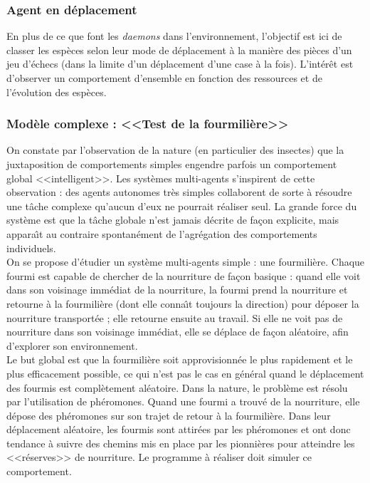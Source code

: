 \documentclass[11pt,twoside,a4paper]{article}
\begin{document}
\subsubsection{Agent en d{\'e}placement}

En plus de ce que font les \emph{daemons} dans l'environnement, l'objectif est ici de classer les esp{\`e}ces selon leur mode de d{\'e}placement {\`a} la mani{\`e}re des pi{\`e}ces d'un jeu d'{\'e}checs (dans la limite d'un d{\'e}placement d'une case {\`a} la fois). L'int{\'e}r{\^e}t est d'observer un comportement d'ensemble en fonction des ressources et de l'{\'e}volution des esp{\`e}ces. 

\clearpage

\subsubsection{Mod{\`e}le complexe : <<Test de la fourmili{\`e}re>>}

On constate par l'observation de la nature (en particulier des insectes) que la juxtaposition de comportements simples engendre parfois un comportement global <<intelligent>>. Les syst{\`e}mes multi-agents s'inspirent de cette observation : des agents autonomes tr{\`e}s simples collaborent de sorte {\`a} r{\'e}soudre une t{\^a}che complexe qu'aucun d'eux ne pourrait r{\'e}aliser seul. La grande force du syst{\`e}me est que la t{\^a}che globale n'est jamais d{\'e}crite de fa\c{c}on explicite, mais appara{\^\i}t au contraire spontan{\'e}ment de l'agr{\'e}gation des comportements individuels.~\\

On se propose d'{\'e}tudier un syst{\`e}me multi-agents simple : une fourmili{\`e}re. Chaque fourmi est capable de chercher de la nourriture de fa\c{c}on basique : quand elle voit dans son voisinage imm{\'e}diat de la nourriture, la fourmi prend la nourriture et retourne {\`a} la fourmili{\`e}re (dont elle conna{\^\i}t toujours la direction) pour d{\'e}poser la nourriture transport{\'e}e ; elle retourne ensuite au travail. Si elle ne voit pas de nourriture dans son voisinage imm{\'e}diat, elle se d{\'e}place de fa\c{c}on al{\'e}atoire, afin d'explorer son environnement.~\\

Le but global est que la fourmili{\`e}re soit approvisionn{\'e}e le plus rapidement et le plus efficacement possible, ce qui n'est pas le cas en g{\'e}n{\'e}ral quand le d{\'e}placement des fourmis est compl{\`e}tement al{\'e}atoire. Dans la nature, le probl{\`e}me est r{\'e}solu par l'utilisation de ph{\'e}romones. Quand une fourmi a trouv{\'e} de la nourriture, elle d{\'e}pose des ph{\'e}romones sur son trajet de retour {\`a} la fourmili{\`e}re. Dans leur d{\'e}placement al{\'e}atoire, les fourmis sont attir{\'e}es par les ph{\'e}romones et ont donc tendance {\`a} suivre des chemins mis en place par les pionni{\`e}res pour atteindre les <<r{\'e}serves>> de nourriture. Le programme {\`a} r{\'e}aliser doit simuler ce comportement.~\\
\end{document}
